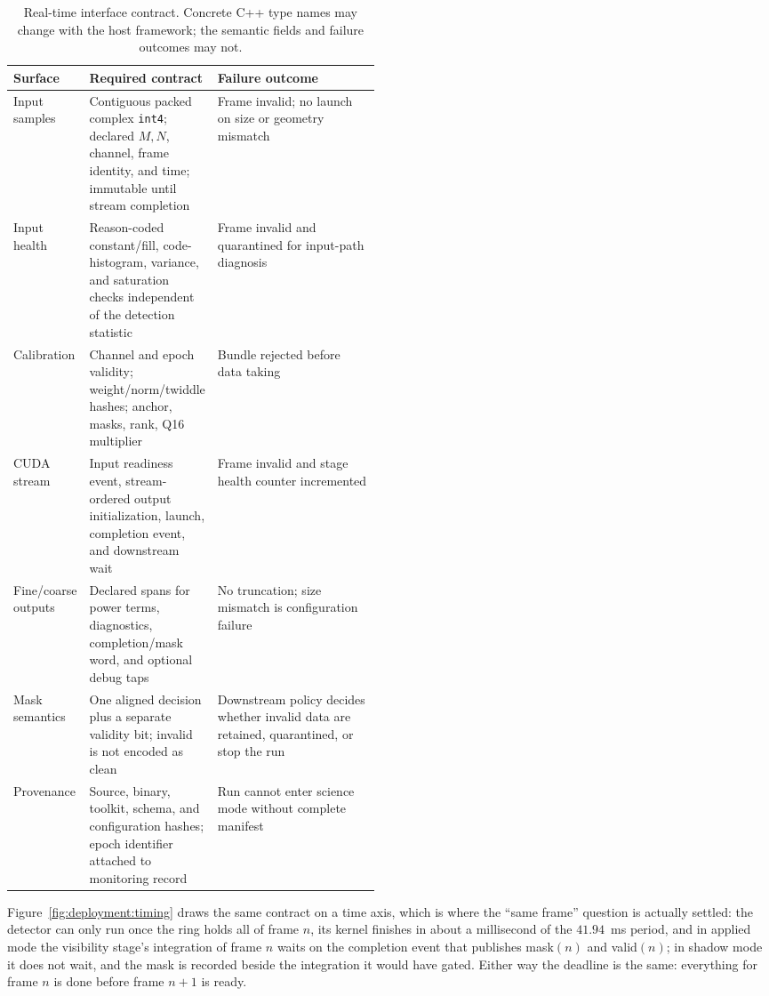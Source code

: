 \begin{table}[t]
\centering
\caption[Real-time interface contract]{Real-time interface contract.  Concrete C++ type names may change with
the host framework; the semantic fields and failure outcomes may not.}
\label{tab:deployment:interface}
\small
\begin{tabularx}{\linewidth}{>{\raggedright\arraybackslash}p{0.18\linewidth}
                             >{\raggedright\arraybackslash}p{0.30\linewidth}X}
\toprule
Surface & Required contract & Failure outcome \\
\midrule
Input samples & Contiguous packed complex \texttt{int4}; declared $M,N$, channel, frame identity, and time; immutable until stream completion & Frame invalid; no launch on size or geometry mismatch \\
Input health & Reason-coded constant/fill, code-histogram, variance, and saturation checks independent of the detection statistic & Frame invalid and quarantined for input-path diagnosis \\
Calibration & Channel and epoch validity; weight/norm/twiddle hashes; anchor, masks, rank, Q16 multiplier & Bundle rejected before data taking \\
CUDA stream & Input readiness event, stream-ordered output initialization, launch, completion event, and downstream wait & Frame invalid and stage health counter incremented \\
Fine/coarse outputs & Declared spans for power terms, diagnostics, completion/mask word, and optional debug taps & No truncation; size mismatch is configuration failure \\
Mask semantics & One aligned decision plus a separate validity bit; invalid is not encoded as clean & Downstream policy decides whether invalid data are retained, quarantined, or stop the run \\
Provenance & Source, binary, toolkit, schema, and configuration hashes; epoch identifier attached to monitoring record & Run cannot enter science mode without complete manifest \\
\bottomrule
\end{tabularx}
\end{table}

Figure~\ref{fig:deployment:timing} draws the same contract on a time axis, which is where the ``same frame'' question is actually settled: the detector can only run once the ring holds all of frame $n$, its kernel finishes in about a millisecond of the $41.94$~ms period, and in applied mode the visibility stage's integration of frame $n$ waits on the completion event that publishes mask$(n)$ and valid$(n)$; in shadow mode it does not wait, and the mask is recorded beside the integration it would have gated. Either way the deadline is the same: everything for frame $n$ is done before frame $n{+}1$ is ready.

